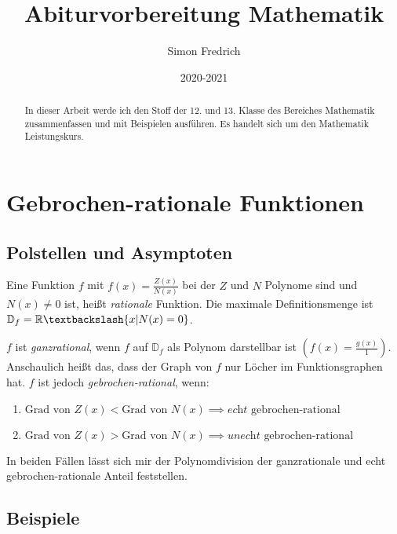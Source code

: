 \documentclass[12pt, a4paper]{report}
\title{Abiturvorbereitung Mathematik}
\author{Simon Fredrich}
\date{2020-2021}
\begin{document}
\begin{titlepage}
\maketitle
\end{titlepage}

\begin{abstract}
In dieser Arbeit werde ich den Stoff der 12. und 13. Klasse des Bereiches Mathematik zusammenfassen und mit Beispielen ausführen. Es handelt sich um den Mathematik Leistungskurs.
\end{abstract}

\chapter{Gebrochen-rationale Funktionen}

\section{Polstellen und Asymptoten}
Eine Funktion $f$ mit $f(x)=\frac{Z(x)}{N(x)}$ bei der $Z$ und $N$ Polynome sind und $N(x)\neq 0$ ist, heißt \textit{rationale} Funktion. Die maximale Definitionsmenge ist $\mathbb{D}_f = \mathbb{R} \textbackslash \{x|N(x) = 0\}$.

$f$ ist \textit{ganzrational}, wenn $f$ auf $\mathbb{D}_f$ als Polynom darstellbar ist $\left(f(x)=\frac{g(x)}{1}\right)$. Anschaulich heißt das, dass der Graph von $f$ nur Löcher im Funktionsgraphen hat. $f$ ist jedoch \textit{gebrochen-rational}, wenn:
\begin{enumerate}
\item
$\text{Grad von } Z(x) < \text{Grad von } N(x) \implies \textit{echt }\text{gebrochen-rational}$
\item
$\text{Grad von } Z(x) > \text{Grad von } N(x) \implies \textit{unecht }\text{gebrochen-rational}$
\end{enumerate}

In beiden Fällen lässt sich mir der Polynomdivision der ganzrationale und echt gebrochen-rationale Anteil feststellen.

\section{Beispiele}
\end{document}
